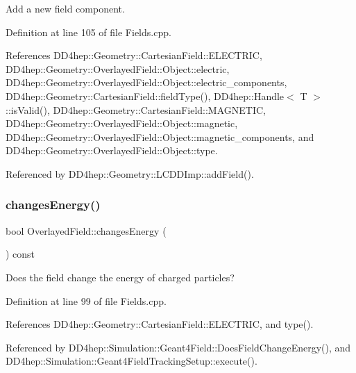 Add a new field component. 



Definition at line 105 of file Fields.\+cpp.



References D\+D4hep\+::\+Geometry\+::\+Cartesian\+Field\+::\+E\+L\+E\+C\+T\+R\+IC, D\+D4hep\+::\+Geometry\+::\+Overlayed\+Field\+::\+Object\+::electric, D\+D4hep\+::\+Geometry\+::\+Overlayed\+Field\+::\+Object\+::electric\+\_\+components, D\+D4hep\+::\+Geometry\+::\+Cartesian\+Field\+::field\+Type(), D\+D4hep\+::\+Handle$<$ T $>$\+::is\+Valid(), D\+D4hep\+::\+Geometry\+::\+Cartesian\+Field\+::\+M\+A\+G\+N\+E\+T\+IC, D\+D4hep\+::\+Geometry\+::\+Overlayed\+Field\+::\+Object\+::magnetic, D\+D4hep\+::\+Geometry\+::\+Overlayed\+Field\+::\+Object\+::magnetic\+\_\+components, and D\+D4hep\+::\+Geometry\+::\+Overlayed\+Field\+::\+Object\+::type.



Referenced by D\+D4hep\+::\+Geometry\+::\+L\+C\+D\+D\+Imp\+::add\+Field().

\hypertarget{class_d_d4hep_1_1_geometry_1_1_overlayed_field_a78c9cee19da6bc34cc53a048c7057363}{}\label{class_d_d4hep_1_1_geometry_1_1_overlayed_field_a78c9cee19da6bc34cc53a048c7057363} 
\subsubsection{\texorpdfstring{changes\+Energy()}{changesEnergy()}}
{\footnotesize\ttfamily bool Overlayed\+Field\+::changes\+Energy (\begin{DoxyParamCaption}{ }\end{DoxyParamCaption}) const}



Does the field change the energy of charged particles? 



Definition at line 99 of file Fields.\+cpp.



References D\+D4hep\+::\+Geometry\+::\+Cartesian\+Field\+::\+E\+L\+E\+C\+T\+R\+IC, and type().



Referenced by D\+D4hep\+::\+Simulation\+::\+Geant4\+Field\+::\+Does\+Field\+Change\+Energy(), and D\+D4hep\+::\+Simulation\+::\+Geant4\+Field\+Tracking\+Setup\+::execute().


